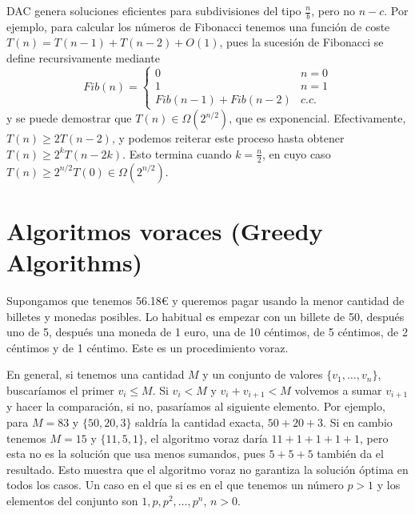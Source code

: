\documentclass[AL.tex]{subfiles}
\begin{document}
\begin{nota}
DAC genera soluciones eficientes para subdivisiones del tipo $\frac{n}{b}$, pero no $n-c$. Por ejemplo, para calcular los números de Fibonacci tenemos una función de coste $T(n)=T(n-1)+T(n-2)+O(1)$, pues la sucesión de Fibonacci se define recursivamente mediante
\[
Fib(n)=\begin{cases}
0 & n=0\\
1 & n=1\\
Fib(n-1)+Fib(n-2) & c.c.
\end{cases}
\]
y se puede demostrar que $T(n)\in\Omega(2^{n/2})$, que es exponencial. Efectivamente, $T(n)\geq 2T(n-2)$, y podemos reiterar este proceso hasta obtener $T(n)\geq 2^kT(n-2k)$. Esto termina cuando $k=\frac{n}{2}$, en cuyo caso $T(n)\geq 2^{n/2}T(0)\in\Omega(2^{n/2})$. 
\end{nota}

\section{Algoritmos voraces (Greedy Algorithms)}
Supongamos que tenemos 56.18€  y queremos pagar usando la menor cantidad de billetes y monedas posibles. Lo habitual es empezar con un billete de 50, después uno de 5, después una moneda de 1 euro, una de 10 céntimos, de 5 céntimos, de 2 céntimos y de 1 céntimo. Este es un procedimiento voraz. 

En general, si tenemos una cantidad $M$ y un conjunto de valores $\{v_1,\dots, v_n\}$, buscaríamos el primer $v_i\leq M$. Si $v_i<M$ y $v_i+v_{i+1}<M$ volvemos a sumar $v_{i+1}$ y hacer la comparación, si no, pasaríamos al siguiente elemento. Por ejemplo, para $M=83$ y $\{50,20,3\}$ saldría la cantidad exacta, $50+20+3$. Si en cambio tenemos $M=15$ y $\{11,5,1\}$, el algoritmo voraz daría $11+1+1+1+1$, pero esta no es la solución que usa menos sumandos, pues $5+5+5$ también da el resultado. Esto muestra que el algoritmo voraz no garantiza la solución óptima en todos los casos. Un caso en el que si es en el que tenemos un número $p>1$ y los elementos del conjunto son $1,p,p^2,\dots, p^n$, $n>0$. 
\end{document}
